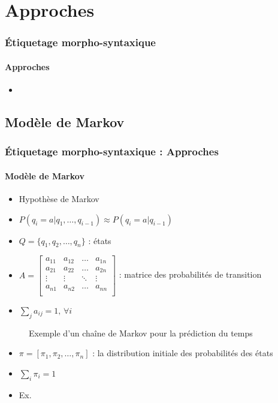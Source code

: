 \documentclass[xcolor=table]{beamer}
\begin{document}
\section{Approches}

\begin{frame}
\frametitle{Étiquetage morpho-syntaxique}
\framesubtitle{Approches}

\begin{itemize}
	\item 
\end{itemize}

\end{frame}

\subsection{Modèle de Markov}

\begin{frame}[fragile]
\frametitle{Étiquetage morpho-syntaxique : Approches}
\framesubtitle{Modèle de Markov}

\begin{minipage}{.64\textwidth}
	\begin{itemize}
		\item Hypothèse de Markov
		\item $ P(q_i = a | q_1, \ldots, q_{i-1}) \approx P(q_i = a | q_{i-1}) $
		\item $Q = \{q_1, q_2, \ldots, q_n\}$ : états
		\item $A = \begin{bmatrix}%
		a_{11} & a_{12} & \ldots & a_{1n} \\
		a_{21} & a_{22} & \ldots & a_{2n} \\
		\vdots & \vdots & \ddots & \vdots \\
		a_{n1} & a_{n2} & \ldots & a_{nn} \\
		\end{bmatrix}$ : matrice des probabilités de transition
		\item $\sum_j a_{ij} = 1,\, \forall i$
	\end{itemize}
\end{minipage}
\begin{minipage}{.35\textwidth}
	\begin{figure}
		\caption{Exemple d'un chaîne de Markov pour la prédiction du temps \cite{2019-jurafsky-martin}}
	\end{figure}
\end{minipage}

\begin{itemize}
	\item $\pi = [\pi_1, \pi_2, \ldots, \pi_n ]$ : la distribution initiale des probabilités des états
	\item $\sum_i \pi_i = 1$
	\item Ex. 
\end{itemize}

\end{frame}
\end{document}
